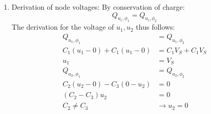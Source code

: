 {\begin{enumerate}
{\begin{enumerate}
{                }
                \item[4.] {
                    Derivation of node voltages:
                    By conservation of charge:
                    \[Q_{u_i, \phi_1} = Q_{u_i, \phi_2}\]
                    The derivation for the voltage of $u_1, u_2$ thus follows:
                    \begin{align*}
                        Q_{u_1, \phi_1} &= Q_{u_1, \phi_2} \\
                        C_1 (u_1 - 0) + C_1 (u_1 - 0) &= C_1 V_S + C_1 V_S \\
                        u_1 &= V_S \\
                        Q_{u_2, \phi_1} &= Q_{u_2, \phi_2} \\
                        C_2 (u_2 - 0) - C_3 (0 - u_2) &= 0 \\
                        (C_2 - C_3) u_2 &= 0 \\
                        C_2 \neq C_3 &\rightarrow u_2 = 0
                    \end{align*}
                    
                }
            \end{enumerate}
        }
    \end{enumerate}
}
